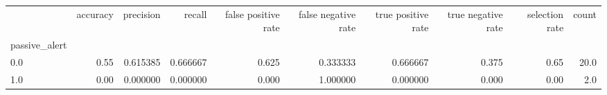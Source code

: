 \begin{tabular}{lrrrrrrrrr}
\toprule
{} &  accuracy &  precision &    recall &  false positive rate &  false negative rate &  true positive rate &  true negative rate &  selection rate &  count \\
passive\_alert &           &            &           &                      &                      &                     &                     &                 &        \\
\midrule
0.0           &      0.55 &   0.615385 &  0.666667 &                0.625 &             0.333333 &            0.666667 &               0.375 &            0.65 &   20.0 \\
1.0           &      0.00 &   0.000000 &  0.000000 &                0.000 &             1.000000 &            0.000000 &               0.000 &            0.00 &    2.0 \\
\bottomrule
\end{tabular}

